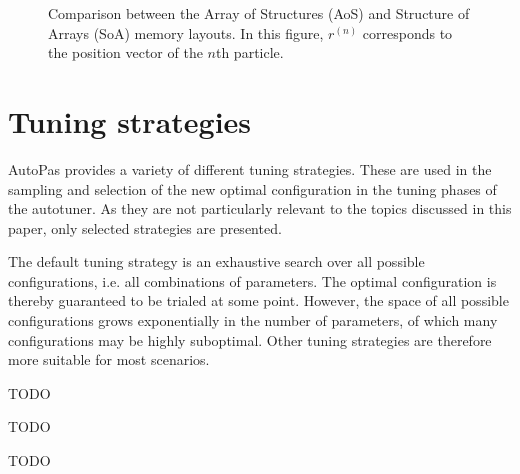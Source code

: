 \begin{figure}[htpb]
\begin{center}
	\end{center}
	\caption{Comparison between the Array of Structures (AoS) and Structure of Arrays (SoA) memory layouts. In this figure, $r^{(n)}$ corresponds to the position vector of the $n$th particle.}
	\label{fig:aos_soa}
\end{figure}

\section{Tuning strategies}
\label{sec:tuning_strategies}

AutoPas provides a variety of different tuning strategies. These are used in the sampling and selection of the new optimal configuration in the tuning phases of the autotuner. As they are not particularly relevant to the topics discussed in this paper, only selected strategies are presented.
\begin{description}[leftmargin=!,labelwidth=\widthof{\textbf{PredictiveTuning }}]
	\item[\textbf{FullSearch}] The default tuning strategy is an exhaustive search over all possible configurations, i.e. all combinations of parameters. The optimal configuration is thereby guaranteed to be trialed at some point. However, the space of all possible configurations grows exponentially in the number of parameters, of which many configurations may be highly suboptimal. Other tuning strategies are therefore more suitable for most scenarios.
	\item[\textbf{PredictiveTuning}] TODO
	\item[\textbf{FuzzyTuning}] TODO \cite{Lerchner2024}
	\item[\textbf{SlowConfigFilter}] TODO
\end{description}

